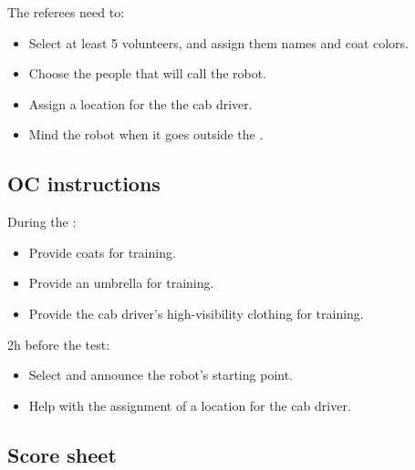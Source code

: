 The referees need to:
\begin{itemize}
	\item Select at least 5 volunteers, and assign them names and coat colors.
	\item Choose the people that will call the robot.
	\item Assign a location for the the cab driver.
	\item Mind the robot when it goes outside the \Arena{}.
\end{itemize}

\subsection*{OC instructions}

During the \SetupDays:
\begin{itemize}
	\item Provide coats for training.
	\item Provide an umbrella for training.
	\item Provide the cab driver's high-visibility clothing for training.
\end{itemize}

2h before the test:
\begin{itemize}
	\item Select and announce the robot's starting point.
	\item Help with the assignment of a location for the cab driver.
\end{itemize}

\subsection*{Score sheet}



